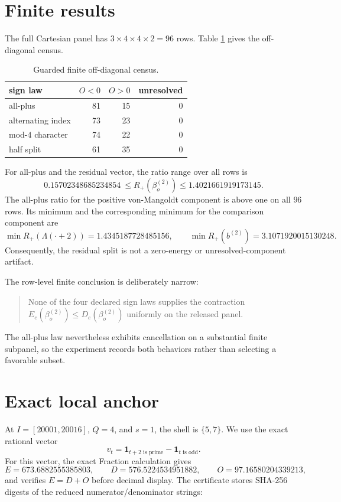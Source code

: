 \documentclass[10pt]{article}
\newcommand{\1}{\mathbf 1}
\begin{document}
\section{Finite results}

The full Cartesian panel has $3\times4\times4\times2=96$ rows.  Table
\ref{tab:census} gives the off-diagonal census.

\begin{table}[ht]
\centering
\caption{Guarded finite off-diagonal census.}
\label{tab:census}
\begin{tabular}{lrrr}
\toprule
sign law & $O<0$ & $O>0$ & unresolved\\
\midrule
all-plus & 81 & 15 & 0\\
alternating index & 73 & 23 & 0\\
mod-$4$ character & 74 & 22 & 0\\
half split & 61 & 35 & 0\\
\bottomrule
\end{tabular}
\end{table}

For all-plus and the residual vector, the ratio range over all rows is
\[
 0.15702348685234854\ \leq R_{+}(\beta_o^{(2)})
 \leq 1.4021661919173145.
\]
The all-plus ratio for the positive von-Mangoldt component is above one on
all $96$ rows.  Its minimum and the corresponding minimum for the comparison
component are
\[
 \min R_+(\Lambda(\mathord{\cdot}+2))=1.4345187728485156,
 \qquad
 \min R_+(b^{(2)})=3.1071920015130248.
\]
Consequently, the residual split
is not a zero-energy or unresolved-component artifact.

The row-level finite conclusion is deliberately narrow:
\begin{quote}
None of the four declared sign laws supplies the contraction
$E_e(\beta_o^{(2)})\leq D_e(\beta_o^{(2)})$ uniformly on the released panel.
\end{quote}
The all-plus law nevertheless exhibits cancellation on a substantial finite
subpanel, so the experiment records both behaviors rather than selecting a
favorable subset.

\section{Exact local anchor}

At $I=[20001,20016]$, $Q=4$, and $s=1$, the shell is $\{5,7\}$.  We use the
exact rational vector
\[
 v_t=\1_{t+2\text{ is prime}}-\1_{t\text{ is odd}}.
\]
For this vector, the exact Fraction calculation gives
\[
 E=673.6882555385803,\qquad
 D=576.5224534951882,\qquad
 O=97.16580204339213,
\]
and verifies $E=D+O$ before decimal display.  The certificate stores
SHA-256 digests of the reduced numerator/denominator strings:
\end{document}
